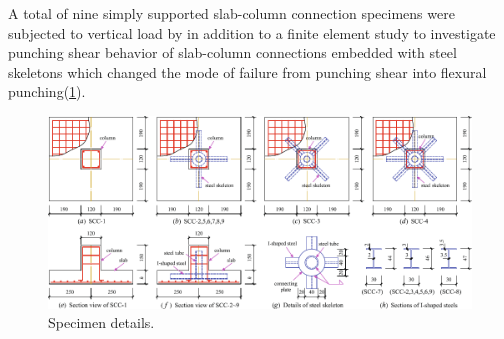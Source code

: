 \documentclass[twocolumn]{article} %
\begin{document}
A total of nine simply supported slab-column connection specimens were subjected to vertical load by \cite{zhou2021} in addition to a finite element study to investigate punching shear behavior of slab-column connections embedded with steel skeletons which changed the mode of failure from punching shear into flexural punching(\ref{z2021f3}).
\begin{figure}\centering
    \includegraphics[width=\textwidth]{Figures/z2021f3.pdf}
    \caption{Specimen details\citep{zhou2021}.}
    \label{z2021f3}
    \end{figure}


\end{document}
